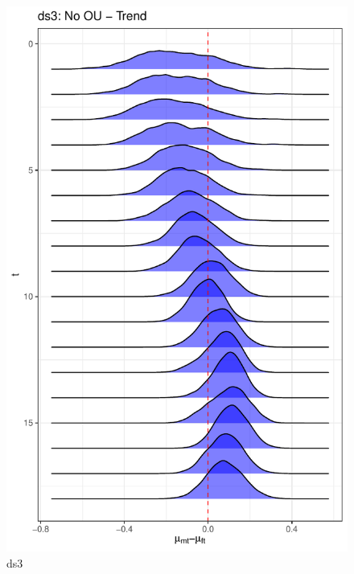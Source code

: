 \documentclass[
  12pt,
]{article}
\begin{document}
\begin{figure}

{\centering \includegraphics[width=0.9\linewidth]{../Figures/ds3/mu_diff} 

}

\caption{ds3}\label{fig:unnamed-chunk-10}
\end{figure}
\end{document}
